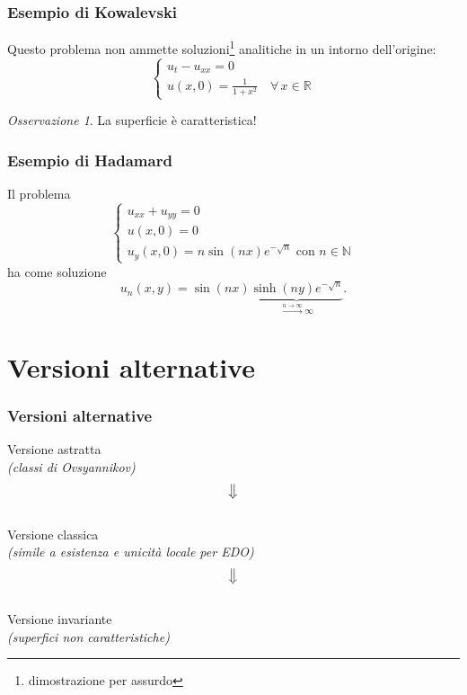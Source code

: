 \documentclass[serif,notheorems]{beamer}
\theoremstyle{definition} %
\theoremstyle{remark}
\newtheorem*{remark}{Osservazione}
\begin{document}
\begin{frame}
\frametitle{Esempio di Kowalevski} 
Questo problema non ammette soluzioni\footnote{dimostrazione per assurdo} analitiche in un intorno dell’origine:
\begin{equation*}
\begin{cases}
u_t-u_{xx}=0\\
u(x,0)=\frac{1}{1+x^2} \quad \forall \, x \in \mathbb{R}
\end{cases}
\end{equation*}
\begin{remark}
La superficie è caratteristica!
\end{remark}
\end{frame}

\begin{frame}
\frametitle{Esempio di Hadamard}
Il problema
\begin{equation*}
\begin{cases}
u_{xx}+u_{yy}=0\\
u(x,0)=0\\ 
u_y(x,0)=n\sin(nx)e^{-\sqrt{n}} \text{ con } n\in\mathbb{N}
\end{cases}
\end{equation*}
ha come soluzione
$$u_n(x,y)=\sin(nx) \underbrace{\sinh(ny)e^{-\sqrt{n}}}_{\xrightarrow{n\rightarrow\infty} \infty}.$$
\end{frame}



\section{Versioni alternative}

\begin{frame}
\frametitle{Versioni alternative}
\begin{center}
\normalsize Versione astratta \\
\footnotesize\textit{(classi di Ovsyannikov)}\\
\normalsize $$\big\Downarrow$$\\
\normalsize Versione classica \\
\footnotesize\textit{(simile a esistenza e unicità locale per EDO)}\\
\normalsize $$\big\Downarrow$$\\
\normalsize Versione invariante \\
\footnotesize\textit{(superfici non caratteristiche)}\\
\end{center}
\end{frame}
\end{document}
